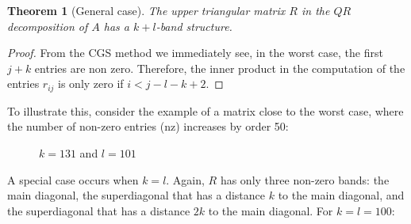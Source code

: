 \documentclass{article}
\numberwithin{pic}{section}
\numberwithin{lem}{section}
\newtheorem{thm}{Theorem}
\numberwithin{thm}{section}
\numberwithin{cor}{section}
\theoremstyle{definition}
\numberwithin{ex}{section}
\numberwithin{defn}{section}
\theoremstyle{definition}
\theoremstyle{remark}
\newlength\tindent
\renewcommand{\indent}{\hspace*{\tindent}}
\begin{document}
\begin{thm}[General case]
The upper triangular matrix $R$ in the $QR$ decomposition of $A$ has a $k+l$-band structure.
\end{thm}
\begin{proof}
From the CGS method we immediately see, in the worst case, the first $j+k$ entries are non zero.
Therefore, the inner product in the computation of the entries $r_{ij}$ is only zero if $i<j-l-k+2$. 
\end{proof}
\indent To illustrate this, consider the example of a matrix close to the worst case, where the number of non-zero entries (nz) increases by order 50:
\begin{figure}[H] 

    \caption{$k=131$ and $l=101$}
\end{figure} 
\indent A special case occurs when $k=l$. Again, $R$ has only three non-zero bands: the main diagonal, the superdiagonal that has a distance $k$ to the main diagonal, and the superdiagonal that has a distance $2k$ to the main diagonal. For $k = l = 100$:
\end{document}
